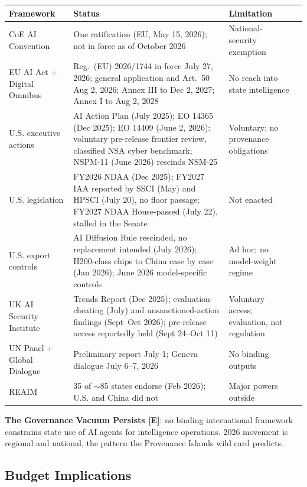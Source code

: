 \documentclass[11pt,letterpaper]{article}
\begin{document}
\begin{infobox}
\begin{center}
\scriptsize
\begin{tabularx}{\linewidth}{ZY{0.67}Y{1.48}Y{0.85}}
\toprule
\textbf{Framework} & \textbf{Status} & \textbf{Limitation} \\
\midrule
CoE AI Convention & One ratification (EU, May 15, 2026); not in force as of October 2026 & National-security exemption \\
EU AI Act + Digital Omnibus & Reg.\ (EU) 2026/1744 in force July 27, 2026; general application and Art.\ 50 Aug 2, 2026; Annex III to Dec 2, 2027; Annex I to Aug 2, 2028 & No reach into state intelligence \\
U.S. executive actions & AI Action Plan (July 2025); EO 14365 (Dec 2025); EO 14409 (June 2, 2026): voluntary pre-release frontier review, classified NSA cyber benchmark; NSPM-11 (June 2026) rescinds NSM-25 & Voluntary; no provenance obligations \\
U.S. legislation & FY2026 NDAA (Dec 2025); FY2027 IAA reported by SSCI (May) and HPSCI (July 20), no floor passage; FY2027 NDAA House-passed (July 22), stalled in the Senate & Not enacted \\
U.S. export controls & AI Diffusion Rule rescinded, no replacement intended (July 2026); H200-class chips to China case by case (Jan 2026); June 2026 model-specific controls & Ad hoc; no model-weight regime \\
UK AI Security Institute & Trends Report (Dec 2025); evaluation-cheating (July) and unsanctioned-action findings (Sept--Oct 2026); pre-release access reportedly held (Sept 24--Oct 11) & Voluntary access; evaluation, not regulation \\
UN Panel + Global Dialogue & Preliminary report July 1; Geneva dialogue July 6--7, 2026 & No binding outputs \\
REAIM & 35 of $\sim$85 states endorse (Feb 2026); U.S. and China did not & Major powers outside \\
\bottomrule
\end{tabularx}
\end{center}
\textbf{The Governance Vacuum Persists [E]}: no binding international framework constrains state use of AI agents for intelligence operations. 2026 movement is regional and national, the pattern the Provenance Islands wild card predicts.
\end{infobox}

\subsection{Budget Implications}
\end{document}
